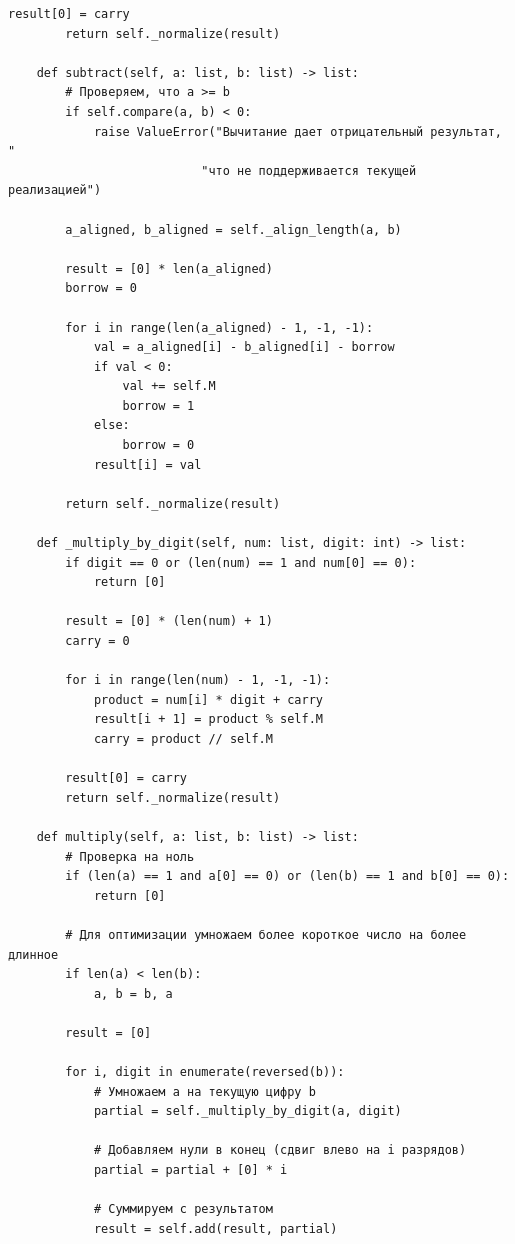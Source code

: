 \documentclass{article}[14pt]
\begin{document}
\begin{lstlisting}[caption={Код исправленной программы}, label=lst:fixed-code]
        result[0] = carry
        return self._normalize(result)
    
    def subtract(self, a: list, b: list) -> list:
        # Проверяем, что a >= b
        if self.compare(a, b) < 0:
            raise ValueError("Вычитание дает отрицательный результат, "
                           "что не поддерживается текущей реализацией")
        
        a_aligned, b_aligned = self._align_length(a, b)
        
        result = [0] * len(a_aligned)
        borrow = 0
        
        for i in range(len(a_aligned) - 1, -1, -1):
            val = a_aligned[i] - b_aligned[i] - borrow
            if val < 0:
                val += self.M
                borrow = 1
            else:
                borrow = 0
            result[i] = val
        
        return self._normalize(result)
    
    def _multiply_by_digit(self, num: list, digit: int) -> list:
        if digit == 0 or (len(num) == 1 and num[0] == 0):
            return [0]
        
        result = [0] * (len(num) + 1)
        carry = 0
        
        for i in range(len(num) - 1, -1, -1):
            product = num[i] * digit + carry
            result[i + 1] = product % self.M
            carry = product // self.M
        
        result[0] = carry
        return self._normalize(result)
    
    def multiply(self, a: list, b: list) -> list:
        # Проверка на ноль
        if (len(a) == 1 and a[0] == 0) or (len(b) == 1 and b[0] == 0):
            return [0]
        
        # Для оптимизации умножаем более короткое число на более длинное
        if len(a) < len(b):
            a, b = b, a
        
        result = [0]
        
        for i, digit in enumerate(reversed(b)):
            # Умножаем a на текущую цифру b
            partial = self._multiply_by_digit(a, digit)
            
            # Добавляем нули в конец (сдвиг влево на i разрядов)
            partial = partial + [0] * i
            
            # Суммируем с результатом
            result = self.add(result, partial)
        

\end{lstlisting}
\end{document}
